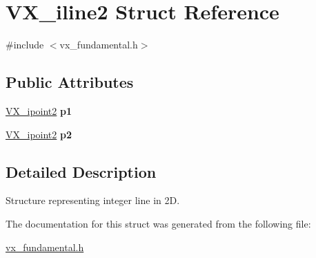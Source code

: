 \hypertarget{structVX__iline2}{\section{V\-X\-\_\-iline2 Struct Reference}
\label{structVX__iline2}
}


{\ttfamily \#include $<$vx\-\_\-fundamental.\-h$>$}

\subsection*{Public Attributes}
\begin{DoxyCompactItemize}
\item 
\hypertarget{structVX__iline2_a149f256272484bca53db780e44f9a8ef}{\hyperlink{structVX__ipoint2}{V\-X\-\_\-ipoint2} {\bfseries p1}}\label{structVX__iline2_a149f256272484bca53db780e44f9a8ef}

\item 
\hypertarget{structVX__iline2_a83b22383a1ec1804a713bf184d3eea64}{\hyperlink{structVX__ipoint2}{V\-X\-\_\-ipoint2} {\bfseries p2}}\label{structVX__iline2_a83b22383a1ec1804a713bf184d3eea64}

\end{DoxyCompactItemize}


\subsection{Detailed Description}
Structure representing integer line in 2\-D. 

The documentation for this struct was generated from the following file\-:\begin{DoxyCompactItemize}
\item 
\hyperlink{vx__fundamental_8h}{vx\-\_\-fundamental.\-h}\end{DoxyCompactItemize}
